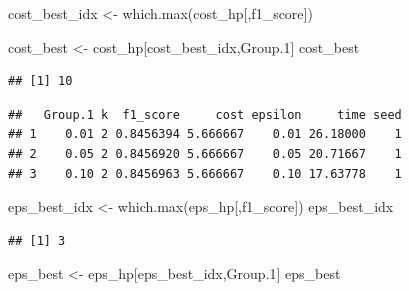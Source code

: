 \documentclass[
]{article}
\newenvironment{Shaded}{\begin{snugshade}}{\end{snugshade}}
\newcommand{\AttributeTok}[1]{\textcolor[rgb]{0.77,0.63,0.00}{#1}}
\newcommand{\CommentTok}[1]{\textcolor[rgb]{0.56,0.35,0.01}{\textit{#1}}}
\newcommand{\FunctionTok}[1]{\textcolor[rgb]{0.00,0.00,0.00}{#1}}
\newcommand{\NormalTok}[1]{#1}
\newcommand{\OtherTok}[1]{\textcolor[rgb]{0.56,0.35,0.01}{#1}}
\newcommand{\SpecialCharTok}[1]{\textcolor[rgb]{0.00,0.00,0.00}{#1}}
\newcommand{\StringTok}[1]{\textcolor[rgb]{0.31,0.60,0.02}{#1}}
\begin{document}
\begin{Shaded}
\begin{Highlighting}[]
\NormalTok{cost\_best\_idx }\OtherTok{\textless{}{-}} \FunctionTok{which.max}\NormalTok{(cost\_hp[,}\StringTok{\textquotesingle{}f1\_score\textquotesingle{}}\NormalTok{])}

\NormalTok{cost\_best }\OtherTok{\textless{}{-}}\NormalTok{ cost\_hp[cost\_best\_idx,}\StringTok{\textquotesingle{}Group.1\textquotesingle{}}\NormalTok{]}
\NormalTok{cost\_best}
\end{Highlighting}
\end{Shaded}

\begin{verbatim}
## [1] 10
\end{verbatim}

\begin{Shaded}
\end{Shaded}

\begin{verbatim}
##   Group.1 k  f1_score     cost epsilon     time seed
## 1    0.01 2 0.8456394 5.666667    0.01 26.18000    1
## 2    0.05 2 0.8456920 5.666667    0.05 20.71667    1
## 3    0.10 2 0.8456963 5.666667    0.10 17.63778    1
\end{verbatim}

\begin{Shaded}
\begin{Highlighting}[]
\NormalTok{eps\_best\_idx }\OtherTok{\textless{}{-}} \FunctionTok{which.max}\NormalTok{(eps\_hp[,}\StringTok{\textquotesingle{}f1\_score\textquotesingle{}}\NormalTok{])}
\NormalTok{eps\_best\_idx}
\end{Highlighting}
\end{Shaded}

\begin{verbatim}
## [1] 3
\end{verbatim}

\begin{Shaded}
\begin{Highlighting}[]
\NormalTok{eps\_best }\OtherTok{\textless{}{-}}\NormalTok{ eps\_hp[eps\_best\_idx,}\StringTok{\textquotesingle{}Group.1\textquotesingle{}}\NormalTok{]}
\NormalTok{eps\_best}
\end{Highlighting}
\end{Shaded}
\end{document}
